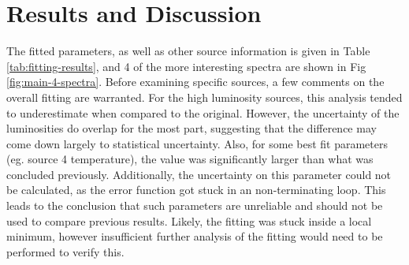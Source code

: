 \documentclass[aps,
                pra,  
                a4paper, 
                amsmath, 
                amssymb, 
                preprint,
                tightenlines,  
                amsfonts,
                nofootinbib,
                notitlepage
            ]{revtex4-2}
\begin{document}
\section{Results and Discussion}
The fitted parameters, as well as other source information is given in Table \ref{tab:fitting-results}, and 4 of the more interesting spectra are shown in Fig \ref{fig:main-4-spectra}. Before examining specific sources, a few comments on the overall fitting are warranted. For the high luminosity sources, this analysis tended to underestimate when compared to the original. However, the uncertainty of the luminosities do overlap for the most part, suggesting that the difference may come down largely to statistical uncertainty. Also, for some best fit parameters (eg. source 4 temperature), the value was significantly larger than what was concluded previously. Additionally, the uncertainty on this parameter could not be calculated, as the {\sc error} function got stuck in an non-terminating loop. This leads to the conclusion that such parameters are unreliable and should not be used to compare previous results. Likely, the fitting was stuck inside a local minimum, however insufficient further analysis of the fitting would need to be performed to verify this. 
\vfill
\end{document}
